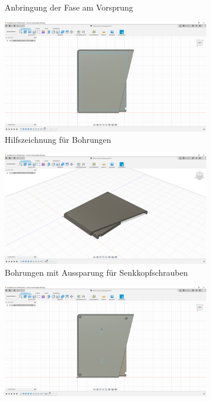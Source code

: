 \begin{figure}[H]
\begin{subfigure}[t]{.3\linewidth}
		\caption[Anbringung der Fase am Vorsprung]{Anbringung der Fase am Vorsprung}
		\label{fig:design-back-09}
	\end{subfigure}
	\begin{subfigure}[t]{.3\linewidth}
		\includegraphics[width=\linewidth]{img/konstruktion_gehaeuse_hinten_010.png}
		\caption[Hilfszeichnung für Bohrungen]{Hilfszeichnung für Bohrungen}
		\label{fig:design-back-10}
	\end{subfigure}
	\begin{subfigure}[t]{.3\linewidth}
		\includegraphics[width=\linewidth]{img/konstruktion_gehaeuse_hinten_011.png}
		\caption[Bohrungen mit Aussparung für Senkkopfschrauben]{Bohrungen mit Aussparung für Senkkopfschrauben}
		\label{fig:design-back-11}
	\end{subfigure}
	\begin{subfigure}[t]{.3\linewidth}
		\includegraphics[width=\linewidth]{img/konstruktion_gehaeuse_hinten_012.png}

\end{subfigure}
\end{figure}
